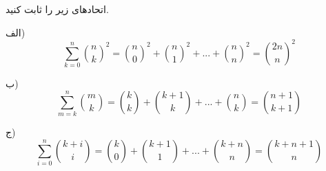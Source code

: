 \EXERCISE
اتحاد‌های زیر را ثابت کنید.

الف)
$$\sum_{k=0}^{n}\binom n k ^2 = \binom n 0 ^2 + \binom n 1 ^2 + ... + \binom n n ^2 = \binom {2n}{n} ^2$$

ب)
$$\sum_{m=k}^{n}\binom m k = \binom {k}{k} + \binom {k+1}{k} + ... + \binom {n}{k} = \binom {n+1}{k+1}$$

ج)
$$\sum_{i=0}^{n}\binom {k+i}{i} = \binom {k}{0} + \binom {k+1}{1} + ... + \binom {k+n}{n} = \binom {k+n+1}{n}$$
